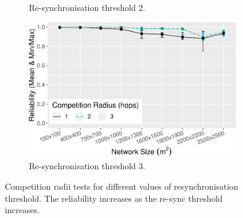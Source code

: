 \begin{figure}[bt]
\begin{subfigure}{\textwidth}
    \caption{Re-synchronisation threshold 2.}
    \label{subfig:resync-treshold-2}
\end{subfigure}
\begin{subfigure}{\textwidth}
    \centering
    \includegraphics[width=\textwidth, keepaspectratio]{figure/Results/ParameterEvaluation/ResyncThreshold3_Reliability.pdf}
    \caption{Re-synchronisation threshold 3.}
    \label{subfig:resync-treshold-3}
\end{subfigure}

    \caption{Competition radii tests for different values of resynchronisation threshold. The reliability increases as the re-sync threshold increases.}
    \label{fig:resync-treshold-tests}
\end{figure}

